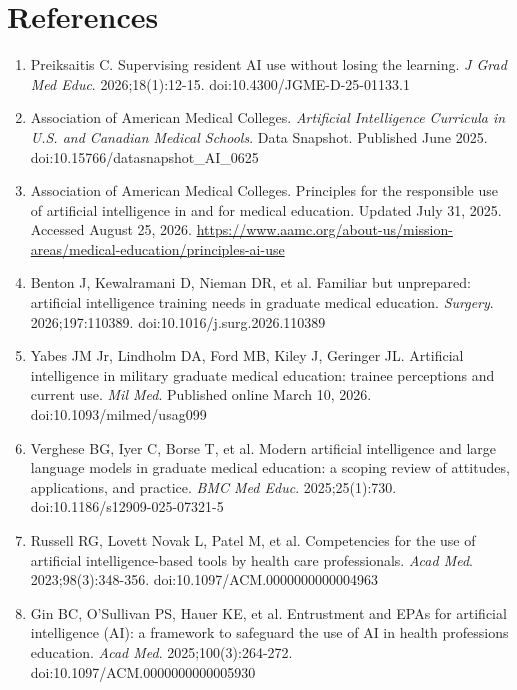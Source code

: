 \documentclass[12pt]{article}
\begin{document}
\section*{References}

\begin{enumerate}
  \item Preiksaitis C. Supervising resident AI use without losing the learning.
        \textit{J Grad Med Educ}. 2026;18(1):12-15.
        doi:10.4300/JGME-D-25-01133.1

  \item Association of American Medical Colleges.
        \textit{Artificial Intelligence Curricula in U.S. and Canadian Medical
        Schools}. Data Snapshot. Published June 2025.
        doi:10.15766/datasnapshot\_AI\_0625

  \item Association of American Medical Colleges. Principles for the
        responsible use of artificial intelligence in and for medical
        education. Updated July 31, 2025. Accessed August 25, 2026.
        \url{https://www.aamc.org/about-us/mission-areas/medical-education/principles-ai-use}

  \item Benton J, Kewalramani D, Nieman DR, et al. Familiar but unprepared:
        artificial intelligence training needs in graduate medical education.
        \textit{Surgery}. 2026;197:110389.
        doi:10.1016/j.surg.2026.110389

  \item Yabes JM Jr, Lindholm DA, Ford MB, Kiley J, Geringer JL. Artificial
        intelligence in military graduate medical education: trainee
        perceptions and current use. \textit{Mil Med}. Published online
        March 10, 2026. doi:10.1093/milmed/usag099

  \item Verghese BG, Iyer C, Borse T, et al. Modern artificial intelligence
        and large language models in graduate medical education: a scoping
        review of attitudes, applications, and practice.
        \textit{BMC Med Educ}. 2025;25(1):730.
        doi:10.1186/s12909-025-07321-5

  \item Russell RG, Lovett Novak L, Patel M, et al. Competencies for the use of
        artificial intelligence-based tools by health care professionals.
        \textit{Acad Med}. 2023;98(3):348-356.
        doi:10.1097/ACM.0000000000004963

  \item Gin BC, O'Sullivan PS, Hauer KE, et al. Entrustment and EPAs for
        artificial intelligence (AI): a framework to safeguard the use of AI
        in health professions education. \textit{Acad Med}.
        2025;100(3):264-272.
        doi:10.1097/ACM.0000000000005930


\end{enumerate}
\end{document}
